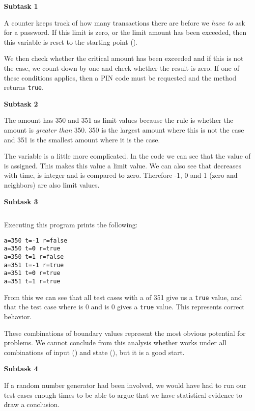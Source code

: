 \textbf{Subtask 1}

A counter  keeps track of how many transactions there are before we \textsl{have to} ask for a password. If this limit is zero, or the limit amount  has been exceeded, then this variable is reset to the starting point ().

We then check whether the critical amount has been exceeded and if this is not the case, we count  down by one and check whether the result is zero. If one of these conditions applies, then a PIN code must be requested and the method returns \texttt{true}.

\textbf{Subtask 2}

The amount  has 350 and 351 as limit values ​​because the rule is whether the amount is \textsl{greater than} 350. 350 is the largest amount where this is not the case and 351 is the smallest amount where it is the case.

The variable  is a little more complicated. In the code we can see that the value of  is assigned. This makes this value a limit value. We can also see that  decreases with time, is integer and is compared to zero. Therefore -1, 0 and 1 (zero and neighbors) are also limit values.

\textbf{Subtask 3}

\inputminted{csharp}{\context/answer/Pin.cs}

Executing this program prints the following:
\begin{verbatim}
a=350 t=-1 r=false
a=350 t=0 r=true
a=350 t=1 r=false
a=351 t=-1 r=true
a=351 t=0 r=true
a=351 t=1 r=true
\end{verbatim}

From this we can see that all test cases with a  of 351 give us a \texttt{true} value, and that the test case where  is 0 and  is 0 gives a \texttt{true} value. This represents correct behavior.

These combinations of boundary values ​​represent the most obvious potential for problems. We cannot conclude from this analysis whether  works under all combinations of input () and state (), but it is a good start.

\textbf{Subtask 4}

If a random number generator had been involved, we would have had to run our test cases enough times to be able to argue that we have statistical evidence to draw a conclusion.
